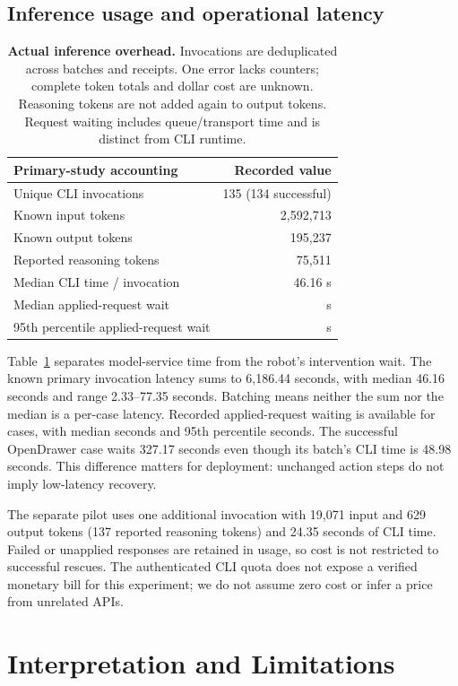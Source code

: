 \documentclass[10pt,twocolumn,letterpaper]{article}
\begin{document}
\subsection{Inference usage and operational latency}
\begin{table}[t]
\centering\small
\begin{tabular}{@{}lr@{}}
\toprule
Primary-study accounting & Recorded value\\
\midrule
Unique CLI invocations &135 (134 successful)\\
Known input tokens &2,592,713\\
Known output tokens &195,237\\
Reported reasoning tokens &75,511\\
Median CLI time / invocation &46.16 s\\
Median applied-request wait &\WaitMedian{} s\\
95th percentile applied-request wait &\WaitPninetyfive{} s\\
\bottomrule
\end{tabular}
\caption{\textbf{Actual inference overhead.} Invocations are deduplicated across batches and receipts. One error lacks counters; complete token totals and dollar cost are unknown. Reasoning tokens are not added again to output tokens. Request waiting includes queue/transport time and is distinct from CLI runtime.}
\label{tab:cost}
\end{table}
Table~\ref{tab:cost} separates model-service time from the robot's intervention wait. The known primary invocation latency sums to 6,186.44 seconds, with median 46.16 seconds and range 2.33--77.35 seconds. Batching means neither the sum nor the median is a per-case latency. Recorded applied-request waiting is available for \WaitN{} cases, with median \WaitMedian{} seconds and 95th percentile \WaitPninetyfive{} seconds. The successful OpenDrawer case waits 327.17 seconds even though its batch's CLI time is 48.98 seconds. This difference matters for deployment: unchanged action steps do not imply low-latency recovery.

The separate pilot uses one additional invocation with 19,071 input and 629 output tokens (137 reported reasoning tokens) and 24.35 seconds of CLI time. Failed or unapplied responses are retained in usage, so cost is not restricted to successful rescues. The authenticated CLI quota does not expose a verified monetary bill for this experiment; we do not assume zero cost or infer a price from unrelated APIs.

\section{Interpretation and Limitations}
\label{sec:limits}
\end{document}
